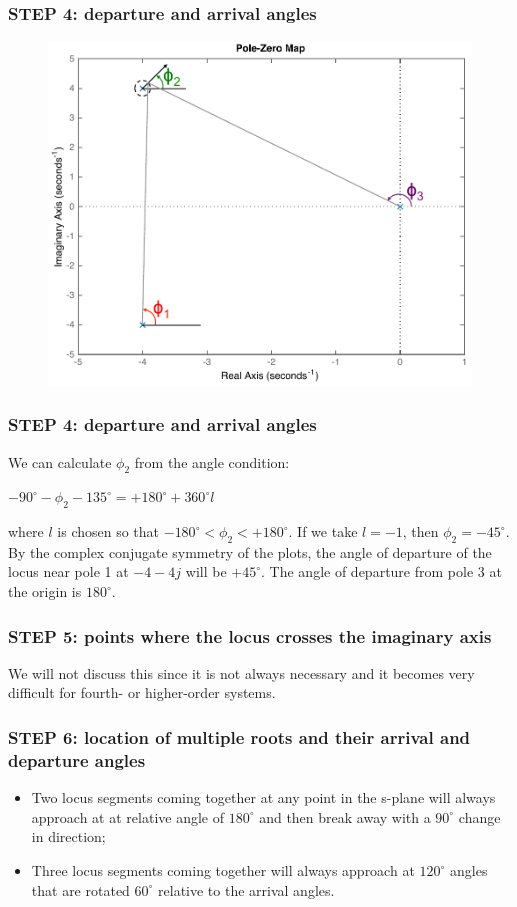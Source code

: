 \begin{frame}
\frametitle{STEP 4: departure and arrival angles}
	\begin{figure}
		\centering
		\includegraphics[width=0.6\linewidth]{how_to_draw_ex4}
	\end{figure}
\end{frame}

\begin{frame}
\frametitle{STEP 4: departure and arrival angles}	
	We can calculate $\phi_2$ from the angle condition:
	\begin{center}
		$-90^{\circ} - \phi_2 - 135^{\circ} = +180^{\circ} + 360^{\circ}l$
	\end{center}
	where $l$ is chosen so that $-180^{\circ} < \phi_2 < +180^{\circ}$. If we take $l = -1$, then $\phi_2 = -45^{\circ}$.\\
	\vspace{1em}
	By the complex conjugate symmetry of the plots, the angle of departure of the locus near pole 1 at $-4 - 4j$ will be $+45^{\circ}$. The angle of departure from pole 3 at the origin is $180^{\circ}$.
\end{frame}

\begin{frame}
\frametitle{STEP 5: points where the locus crosses the imaginary axis}	
	We will not discuss this since it is not always necessary and it becomes very difficult for fourth- or higher-order systems.
\end{frame}

\begin{frame}
\frametitle{STEP 6: location of multiple roots and their arrival and departure angles}
	\begin{itemize}
	\item Two locus segments coming together at any point in the s-plane will always approach at at relative angle of $180^{\circ}$ and then break away with a $90^{\circ}$ change in direction; 
	\item Three locus segments coming together will always approach at $120^{\circ}$ angles that are rotated $60^{\circ}$ relative to the arrival angles.
	\end{itemize}
\end{frame}

